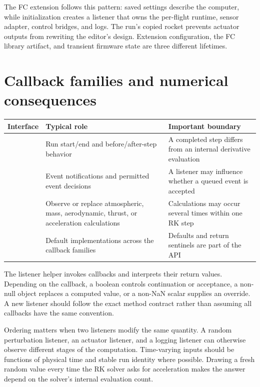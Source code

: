 The FC extension follows this pattern: saved settings describe the computer, while initialization creates a listener that owns the per-flight runtime, sensor adapter, control bridges, and logs. The run's copied rocket prevents actuator outputs from rewriting the editor's design. Extension configuration, the FC library artifact, and transient firmware state are three different lifetimes.


\section{Callback families and numerical consequences}
\begin{tabularx}{\linewidth}{@{}L{4cm}YY@{}}\toprule
Interface & Typical role & Important boundary\\\midrule
{} & Run start/end and before/after-step behavior & A completed step differs from an internal derivative evaluation\\
 & Event notifications and permitted event decisions & A listener may influence whether a queued event is accepted\\
 & Observe or replace atmospheric, mass, aerodynamic, thrust, or acceleration calculations & Calculations may occur several times within one RK step\\
 & Default implementations across the callback families & Defaults and return sentinels are part of the API\\\bottomrule
\end{tabularx}

The listener helper invokes callbacks and interprets their return values. Depending on the callback, a boolean controls continuation or acceptance, a non-null object replaces a computed value, or a non-NaN scalar supplies an override. A new listener should follow the exact method contract rather than assuming all callbacks have the same convention.

Ordering matters when two listeners modify the same quantity. A random perturbation listener, an actuator listener, and a logging listener can otherwise observe different stages of the computation. Time-varying inputs should be functions of physical time and stable run identity where possible. Drawing a fresh random value every time the RK solver asks for acceleration makes the answer depend on the solver's internal evaluation count.

